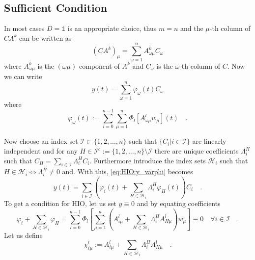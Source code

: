 \clearpage
\subsection{Sufficient Condition}
In most cases $D=\mathbb{1}$ is an appropriate choice, thus $m=n$ and the $\mu$-th column
of $CA^k$ can be written as
\begin{equation}
\left(CA^k \right)_\mu = \sum\limits_{\omega = 1}^n A^k_{\omega\mu} C_\omega
\end{equation}
where $A^k_{\omega\mu}$ is the $(\omega\mu)$ component of $A^k$ and $C_\omega$ is the 
$\omega$-th column of $C$.
Now we can write 
\begin{equation}
y(t) = \sum\limits_{\omega=1}^n \varphi_\omega (t) C_\omega  \label{eq:HIO:y_varphi}
\end{equation}
where 
\begin{equation}
\varphi_\omega(t) :=\sum\limits_{l=0}^{n-1}  
\sum\limits_{\mu=1}^{n} 
 \Phi_l\left[A^l_{\omega\mu} w_\mu \right](t) \quad .
\end{equation}

Now choose an index set $\mathcal{I}\subset \{1,2,\ldots,n\}$ such that $\{C_i|i\in
\mathcal{I}\}$ are linearly 
independent and for any $H\in \mathcal{I}^c:=\{1,2,\ldots,n\}\setminus \mathcal{I}$
there are unique coefficients $
\Lambda_i^H$ such that $C_H=\sum_{i\in\mathcal{I}} \Lambda^H_i C_i$. 
Furthermore introduce the index sets $\mathcal{H}_i$ such that $H\in \mathcal{H}_i 
\Leftrightarrow \Lambda_i^H \neq 0$ and. With this, \eqref{eq:HIO:y_varphi} becomes 
\begin{equation}
y(t) = \sum\limits_{i\in\mathcal{I}} \left(\varphi_i(t) + \sum\limits_{H\in 
	\mathcal{H}_i}\Lambda^H_i \varphi_H(t) \right) C_i  \quad .
\end{equation}
To get a condition for HIO, let us set $y\equiv 0$ and by equating coefficients 
\begin{equation}
\varphi_i + \sum\limits_{H\in\mathcal{H}_i} \varphi_H 
 = \sum\limits_{l=0}^{n-1} \Phi_l \left[
\sum\limits_{\mu=1}^n  \left( 
A^l_{i\mu} + \sum\limits_{H\in\mathcal{H}_i} \Lambda^H_i A^l_{H\mu}
\right) w_\mu
\right]
 \equiv 0 \quad \forall i\in\mathcal{I}  \quad . \label{eq:HIO:varphi=0}
\end{equation}
Let us define
\begin{equation}
\chi_{i\mu}^l := A^l_{i\mu} + \sum\limits_{H\in\mathcal{H}_i} \Lambda^H_i A^l_{H\mu}
\quad . \label{eq:HIO:chi}
\end{equation}



